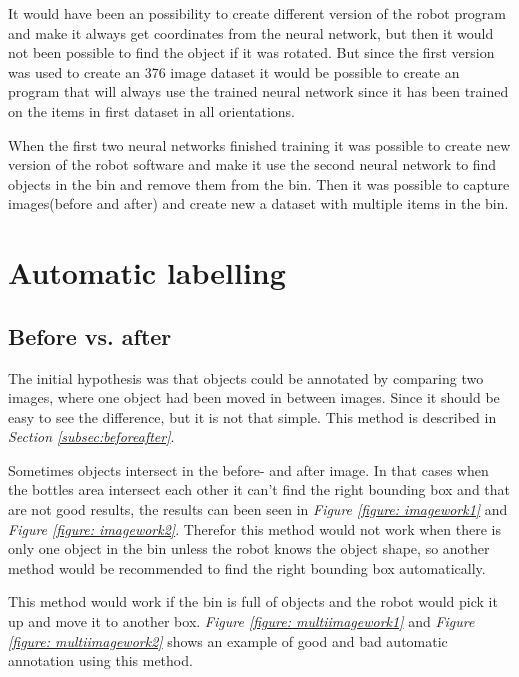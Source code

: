 It would have been an possibility to create different version of the robot program and make it always get coordinates from the neural network, but then it would not been possible to find the object if it was rotated. But since the first version was used to create an 376 image dataset it would be possible to create an program that will always use the trained neural network since it has been trained on the items in first dataset in all orientations.

When the first two neural networks finished training it was possible to create new version of the robot software and make it use the second neural network to find objects in the bin and remove them from the bin. Then it was possible to capture images(before and after) and create new a dataset with multiple items in the bin.

\section{Automatic labelling}
\subsection{Before vs. after}
The initial hypothesis was that objects could be annotated by comparing two images, where one object had been moved in between images. Since it should be easy to see the difference, but it is not that simple. This method is described in \textit{Section \ref{subsec:beforeafter}}.

Sometimes objects intersect in the before- and after image. In that cases when the bottles area intersect each other it can't find the right bounding box and that are not good results, the results can been seen in \textit{Figure \ref{figure: imagework1}} and \textit{Figure \ref{figure: imagework2}}. Therefor this method would not work  when there is only one object in the bin unless the robot knows the object shape, so another method would be recommended to find the right bounding box automatically. 

This method would work if the bin is full of objects and the robot would pick it up and move it to another box. \textit{Figure \ref{figure: multiimagework1}} and \textit{Figure \ref{figure: multiimagework2}} shows an example of good and bad automatic annotation using this method. 

